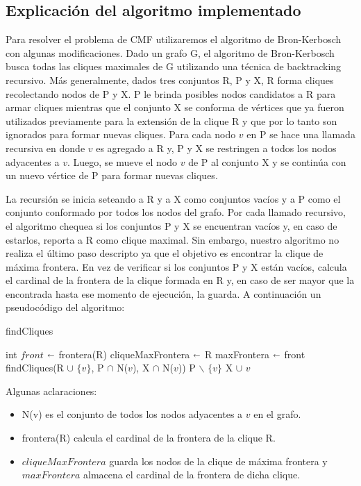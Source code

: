 \subsection{Explicación del algoritmo implementado}

Para resolver el problema de CMF utilizaremos el algoritmo de Bron-Kerbosch con algunas modificaciones. Dado un grafo G, el algoritmo de Bron-Kerbosch busca todas las cliques maximales de G utilizando una técnica de backtracking recursivo. Más generalmente, dados tres conjuntos R, P y X, R forma cliques recolectando nodos de P y X. P le brinda posibles nodos candidatos a R para armar cliques mientras que el conjunto X se conforma de vértices que ya fueron utilizados previamente para la extensión de la clique R y que por lo tanto son ignorados para formar nuevas cliques. Para cada nodo $v$ en P se hace una llamada recursiva en donde $v$ es agregado a R y, P y X se restringen a todos los nodos adyacentes a $v$. Luego, se mueve el nodo $v$ de P al conjunto X y se continúa con un nuevo vértice de P para formar nuevas cliques.

La recursión se inicia seteando a R y a X como conjuntos vacíos y a P como el conjunto conformado por todos los nodos del grafo. Por cada llamado recursivo, el algoritmo chequea si los conjuntos P y X se encuentran vacíos y, en caso de estarlos, reporta a R como clique maximal. Sin embargo, nuestro algoritmo no realiza el último paso descripto ya que el objetivo es encontrar la clique de máxima frontera. En vez de verificar si los conjuntos P y X están vacíos, calcula el cardinal de la frontera de la clique formada en R y, en caso de ser mayor que la encontrada hasta ese momento de ejecución, la guarda. A continuación un pseudocódigo del algoritmo:

\begin{algorithm}[H]
\caption{findCliques}\label{ej1}
\begin{algorithmic}[1]
	\State int $front$ $\shortleftarrow$ frontera(R)
		\State cliqueMaxFrontera $\shortleftarrow$ R
		\State maxFrontera $\shortleftarrow$ front
	\EndIf
		\State findCliques(R $\cup$ $\{v\}$, P $\cap$ N($v$), X $\cap$ N($v$))
	\EndFor
	\State P $\backslash$ $\{v\}$
	\State X $\cup$ $v$
\EndProcedure
\end{algorithmic}
\end{algorithm}

Algunas aclaraciones:
\begin{itemize}
	\item N(v) es el conjunto de todos los nodos adyacentes a $v$ en el grafo.
	\item frontera(R) calcula el cardinal de la frontera de la clique R.
	\item $cliqueMaxFrontera$ guarda los nodos de la clique de máxima frontera y $maxFrontera$ almacena el cardinal de la frontera de dicha clique.
\end{itemize}


